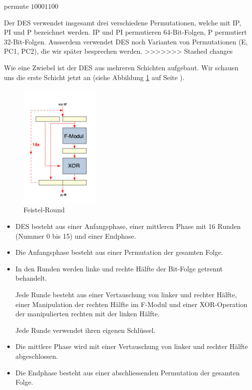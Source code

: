 \documentclass[%
<<<<<<< Updated upstream
11pt,%
twoside,%
titlepage,%
german,%
headsepline%
]{scrartcl}
\begin{document}
\begin{lsg}{permute}
    $10001100$
\end{lsg}

Der DES verwendet insgesamt drei verschiedene Permutationen, welche mit IP, PI und P bezeichnet werden. IP und PI permutieren 64-Bit-Folgen, P permutiert 32-Bit-Folgen. Ausserdem verwendet DES noch Varianten von Permutationen (E, PC1, PC2), die wir später besprechen werden.
>>>>>>> Stashed changes

Wie eine Zwiebel ist der DES aus mehreren Schichten aufgebaut. Wir schauen uns die erste Schicht jetzt an (siehe Abbildung \ref{abb:feistel} auf Seite \pageref{abb:feistel}).

\begin{figure}
\begin{center}
\includegraphics[width=0.35\textwidth]{pictures/zbl6}
\end{center}
\caption{Feistel-Round}\label{abb:feistel}
\end{figure}

\begin{itemize}
\item DES besteht aus einer Anfangsphase, einer mittleren Phase mit 16 Runden (Nummer 0 bis 15) und einer Endphase.
\item Die Anfangsphase besteht aus einer Permutation der gesamten Folge.
\item In den Runden werden linke und rechte Hälfte der Bit-Folge getrennt behandelt.

Jede Runde besteht aus einer Vertauschung von linker und rechter Hälfte, einer Manipulation der rechten Hälfte im F-Modul und einer XOR-Operation der manipulierten rechten mit der linken Hälfte.

Jede Runde verwendet ihren eigenen Schlüssel.
\item Die mittlere Phase wird mit einer Vertauschung von linker und rechter Hälfte abgeschlossen.
\item Die Endphase besteht aus einer abschliessenden Permutation der gesamten Folge.
\end{itemize}
\end{document}

